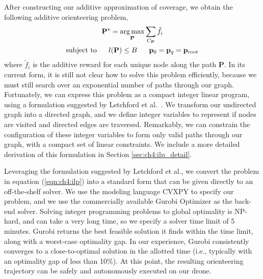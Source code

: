 After constructing our additive approximation of coverage, we obtain the following additive orienteering problem, 
%
\begin{equation}
\begin{aligned}
\mathbf{P}^{\star} = \operatorname*{arg\,max}_{\mathbf{P}} \sum_{C_{\mathbf{P}}} \tilde f_i~~~~~~~~~~~~~~~\\
\text{subject to} ~~~~~ l(\mathbf{P}) \leq B ~~~~~ \mathbf{p}_0 = \mathbf{p}_q = \mathbf{p}_\text{root}
\end{aligned}
\label{eqn:ch4:ilp}
\end{equation}
%
where $\tilde f_i$ is the additive reward for each unique node along the path $\mathbf{P}$.
In its current form, it is still not clear how to solve this problem efficiently, because we must still search over an exponential number of paths through our graph.
Fortunately, we can express this problem as a compact integer linear program, using a formulation suggested by Letchford et al.~\cite{letchford:2013}.
We transform our undirected graph into a directed graph, and we define integer variables to represent if nodes are visited and directed edges are traversed.
Remarkably, we can constrain the configuration of these integer variables to form only valid paths through our graph, with a compact set of linear constraints.
We include a more detailed derivation of this formulation in Section \ref{sec:ch4:ilp_detail}.

Leveraging the formulation suggested by Letchford et al., we convert the problem in equation (\ref{eqn:ch4:ilp}) into a standard form that can be given directly to an off-the-shelf solver.
We use the modeling language CVXPY \cite{cvxpy:2016} to specify our problem, and we use the commercially available Gurobi Optimizer \cite{gurobi:2017} as the back-end solver.
Solving integer programming problems to global optimality is NP-hard, and can take a very long time, so we specify a solver time limit of 5 minutes.
Gurobi returns the best feasible solution it finds within the time limit, along with a worst-case optimality gap.
In our experience, Gurobi consistently converges to a close-to-optimal solution in the allotted time (i.e., typically with an optimality gap of less than 10\%).
At this point, the resulting orienteering trajectory can be safely and autonomously executed on our drone.



